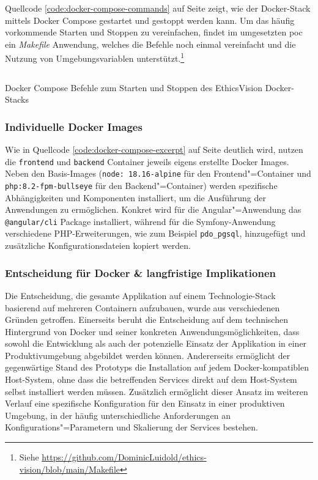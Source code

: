 \documentclass[a4paper,12pt,twoside,numbers=noendperiod]{scrreprt}
\begin{document}
\medskip

Quellcode \ref{code:docker-compose-commands} auf Seite \pageref{code:docker-compose-commands} zeigt, wie der Docker-Stack mittels Docker Compose gestartet und gestoppt werden kann. Um das häufig vorkommende Starten und Stoppen zu vereinfachen, findet im umgesetzten \ac{poc} ein \textit{Makefile} Anwendung, welches die Befehle noch einmal vereinfacht und die Nutzung von Umgebungsvariablen unterstützt.\footnote{Siehe \url{https://github.com/DominicLuidold/ethics-vision/blob/main/Makefile}}

\begin{listing}[ht]
    \inputminted[fontsize=\footnotesize,linenos,xleftmargin=8mm]{bash}{code/Luidold_Docker-Compose-Commands.sh}
    \caption{Docker Compose Befehle zum Starten und Stoppen des EthicsVision Docker-Stacks}
    \label{code:docker-compose-commands}
\end{listing}

\subsubsection*{Individuelle Docker Images}
\label{sub-sub-sec:individuelle-docker-images}

Wie in Quellcode \ref{code:docker-compose-excerpt} auf Seite \pageref{code:docker-compose-excerpt} deutlich wird, nutzen die \texttt{frontend} und \texttt{backend} Container jeweils eigens erstellte Docker Images. Neben den Basis-Images (\texttt{node: 18.16-alpine} für den Frontend"=Container und \texttt{php:8.2-fpm-bullseye} für den Backend"=Container) werden spezifische Abhängigkeiten und Komponenten installiert, um die Ausführung der Anwendungen zu ermöglichen. Konkret wird für die Angular"=Anwendung das \texttt{@angular/cli} Package installiert, während für die Symfony-Anwendung verschiedene PHP-Erweiterungen, wie zum Beispiel \texttt{pdo\_pgsql}, hinzugefügt und zusätzliche Konfigurationsdateien kopiert werden.

\subsubsection*{Entscheidung für Docker \& langfristige Implikationen}
\label{sub-sub-sec:entscheidung-docker}

Die Entscheidung, die gesamte Applikation auf einem Technologie-Stack basierend auf mehreren Containern aufzubauen, wurde aus verschiedenen Gründen getroffen. Einerseits beruht die Entscheidung auf dem technischen Hintergrund von Docker und seiner konkreten Anwendungsmöglichkeiten, dass sowohl die Entwicklung als auch der potenzielle Einsatz der Applikation in einer Produktivumgebung abgebildet werden können. Andererseits ermöglicht der gegenwärtige Stand des Prototyps die Installation auf jedem Docker-kompatiblen Host-System, ohne dass die betreffenden Services direkt auf dem Host-System selbst installiert werden müssen. Zusätzlich ermöglicht dieser Ansatz im weiteren Verlauf eine spezifische Konfiguration für den Einsatz in einer produktiven Umgebung, in der häufig unterschiedliche Anforderungen an Konfigurations"=Parametern und Skalierung der Services bestehen.
\end{document}
